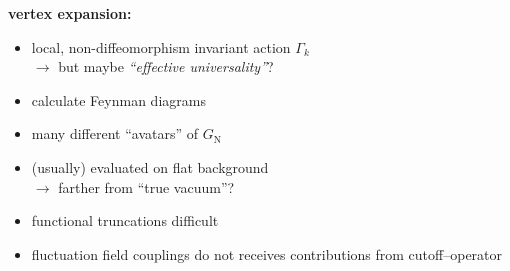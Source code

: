 \documentclass[]{beamer}  %
\newcommand\GNewton{ G_{\scriptscriptstyle{\mathrm{N}}}{} }
\begin{document}
\begin{frame}
\begin{columns}[T]
    \begin{column}{.55\textwidth}
      \begin{center}
        \textbf{vertex expansion:}
        \begin{itemize}
          \item
            local, non-diffeomorphism invariant action $\Gamma_k$\\
            $\rightarrow$ but maybe \textit{``effective universality''}?\\[8pt]
          \item
            calculate Feynman diagrams\\[8pt]
          \item
            many different ``avatars'' of $\GNewton$\\[8pt]
          \item
            (usually) evaluated on flat background\\
            $\rightarrow$ farther from ``true vacuum''?\\[8pt]
          \item
            functional truncations difficult\\[8pt]
          \item
            fluctuation field couplings do not receives contributions
            from cutoff--operator\\[8pt]
        \end{itemize}
      \end{center}
    \end{column}

  \end{columns}
\end{frame}


\end{document}
